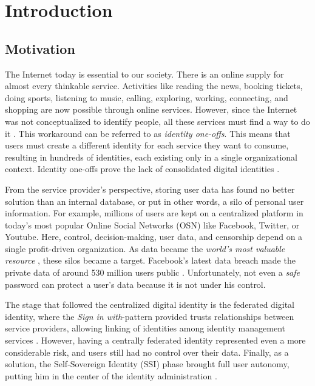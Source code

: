 \chapter{Introduction}
\label{cha:introduction}

\section{Motivation}

The Internet today is essential to our society. There is an online supply for almost every thinkable service. Activities like reading the news, booking tickets, doing sports, listening to music, calling, exploring, working, connecting, and shopping are now possible through online services. However, since the Internet was not conceptualized to identify people, all these services must find a way to do it \cite{Tobin_Reed_Windley_Foundation_2017}. This workaround can be referred to as \emph{identity one-offs}. This means that users must create a different identity for each service they want to consume, resulting in hundreds of identities, each existing only in a single organizational context. Identity one-offs prove the lack of consolidated digital identities \cite{macinnis_2019}.

From the service provider's perspective, storing user data has found no better solution than an internal database, or put in other words, a silo of personal user information. For example, millions of users are kept on a centralized platform in today's most popular Online Social Networks (OSN) like Facebook, Twitter, or Youtube. Here, control, decision-making, user data, and censorship depend on a single profit-driven organization. As data became the \emph{world's most valuable resource} \cite{parkins_2017}, these silos became a target. Facebook's latest data breach made the private data of around 530 million users public \cite{holmes_2021}. Unfortunately, not even a \emph{safe} password can protect a user's data because it is not under his control. 

The stage that followed the centralized digital identity is the federated digital identity, where the \emph{Sign in with}-pattern provided trusts relationships between service providers, allowing linking of identities among identity management services \cite{1556498}. However, having a centrally federated identity represented even a more considerable risk, and users still had no control over their data. Finally, as a solution, the Self-Sovereign Identity (SSI) phase brought full user autonomy, putting him in the center of the identity administration \cite{allen_2016}.  

